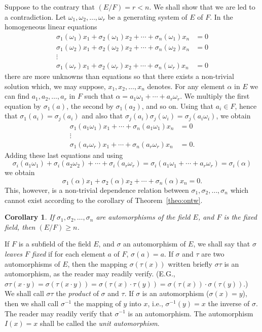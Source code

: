 \documentclass[10pt,leqno]{article}
\newtheorem*{coro*}{Corollary}
\theoremstyle{definition}
\begin{document}
Suppose to the contrary that $(E/F) = r < n$.
We shall show that we are led to a contradiction.
Let $\omega_1, \omega_2, \ldots, \omega_r$ be a generating system of $E$ of $F$.
In the homogeneous linear equations
\begin{align*}
\sigma_1(\omega_1)x_1 + \sigma_2(\omega_1)x_2 + \cdots + \sigma_n(\omega_1)x_n &= 0
\\
\sigma_1(\omega_2)x_1 + \sigma_2(\omega_2)x_2 + \cdots + \sigma_n(\omega_2)x_n &= 0
\\
\vdots &
\\
\sigma_1(\omega_r)x_1 + \sigma_2(\omega_r)x_2 + \cdots + \sigma_n(\omega_r)x_n &= 0
\end{align*}
there are more unknowns than equations so that there exists a non-trivial solution which, we may suppose, $x_1, x_2, \ldots, x_n$ denotes.
For any element $\alpha$ in $E$ we can find $a_1, a_2, \ldots, a_r$ in $F$ such that $\alpha = a_1 \omega_1 + \cdots + a_r \omega_r$.
We multiply the first equation by $\sigma_1(a)$, the second by $\sigma_1(a_2)$, and so on.
Using that $a_i \in F$, hence that $\sigma_1(a_i) = \sigma_j(a_i)$ and also that $\sigma_j(a_i) \sigma_j(\omega_i) = \sigma_j(a_i \omega_i)$, we obtain
\begin{align*}
\sigma_1(a_1 \omega_1)x_1 + \cdots + \sigma_n(a_1 \omega_1)x_n &= 0
\\
\vdots &
\\
\sigma_1(a_r \omega_r)x_1 + \cdots + \sigma_n(a_r \omega_r)x_n &= 0.
\end{align*}
Adding these last equations and using
\[
\sigma_i(a_1 \omega_1) + \sigma_i(a_2 \omega_2) + \cdots + \sigma_i(a_r \omega_r)
= \sigma_i(a_1 \omega_1 + \cdots + a_r \omega_r) 
= \sigma_i(\alpha)
\]
we obtain
\[
\sigma_1(\alpha)x_1 + \sigma_2(\alpha)x_2 + \cdots + \sigma_n(\alpha)x_n = 0.
\]
This, however, is a non-trivial dependence relation between $\sigma_1, \sigma_2, \ldots, \sigma_n$ which cannot exist according to the corollary of Theorem~\ref{theo:ontw}. 


\begin{coro*}
If $\sigma_1, \sigma_2, \ldots, \sigma_n$ are automorphisms of the field $E$, and $F$ is the fixed field, then $(E/F) \geq n$.
\end{coro*}


If $F$ is a subfield of the field $E$, and $\sigma$ an automorphism of $E$, we shall say that $\sigma$ \emph{leaves $F$ fixed} if for each element $a$ of $F$, $\sigma(a) = a$.
If $\sigma$ and $\tau$ are two automorphisms of $E$, then the mapping $\sigma(\tau(x))$ written briefly $\sigma\tau$ is an automorphism, as the reader may readily verify.
(E.G., $\sigma\tau(x\cdot y) = \sigma(\tau(x \cdot y)) = \sigma(\tau(x) \cdot \tau(y)) = \sigma(\tau(x)) \cdot \sigma(\tau(y))$.)
We shall call $\sigma\tau$ the \emph{product} of $\sigma$ and $\tau$.
If $\sigma$ is an automorphism ($\sigma(x) = y$), then we shall call $\sigma^{-1}$ the mapping of $y$ into $x$, i.e., $\sigma^{-1}(y) = x$ the inverse of $\sigma$.\label{p38}
The reader may readily verify that $\sigma^{-1}$ is an automorphism.
The automorphism $I(x) = x$ shall be called the \emph{unit automorphism}.
\end{document}
